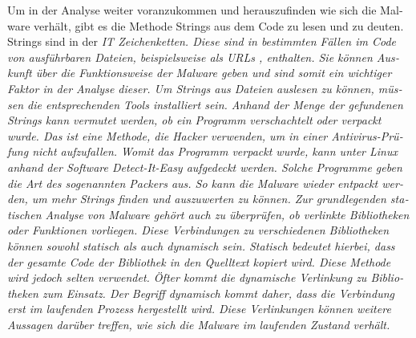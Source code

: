 \begin{otherlanguage}{ngerman}
Um in der Analyse weiter voranzukommen und herauszufinden wie sich die Malware verhält, gibt es die Methode Strings aus dem Code zu lesen und zu deuten. Strings sind in der \it IT \rm Zeichenketten. Diese sind in bestimmten Fällen im Code von ausführbaren Dateien, beispielsweise als \it URLs \rm, enthalten. Sie können Auskunft über die Funktionsweise der Malware geben und sind somit ein wichtiger Faktor in der Analyse dieser. Um Strings aus Dateien auslesen zu können, müssen die entsprechenden Tools installiert sein. Anhand der Menge der gefundenen Strings kann vermutet werden, ob ein Programm verschachtelt oder verpackt wurde. Das ist eine Methode, die Hacker verwenden, um in einer Antivirus-Prüfung nicht aufzufallen. Womit das Programm verpackt wurde, kann unter Linux anhand der Software \dq Detect-It-Easy\dq{} aufgedeckt werden. Solche Programme geben die Art des sogenannten \dq Packers\dq{} aus. So kann die Malware wieder entpackt werden, um mehr Strings finden und auszuwerten zu können.
\newline 
Zur grundlegenden statischen Analyse von Malware gehört auch zu überprüfen, ob verlinkte Bibliotheken oder Funktionen vorliegen. Diese Verbindungen zu verschiedenen Bibliotheken können sowohl statisch als auch dynamisch sein. Statisch bedeutet hierbei, dass der gesamte Code der Bibliothek in den Quelltext kopiert wird. Diese Methode wird jedoch selten verwendet. Öfter kommt die dynamische Verlinkung zu Bibliotheken zum Einsatz. Der Begriff \dq dynamisch \dq{} kommt daher, dass die Verbindung erst im laufenden Prozess hergestellt wird. Diese Verlinkungen können weitere Aussagen darüber treffen, wie sich die Malware im laufenden Zustand verhält.

\end{otherlanguage}
